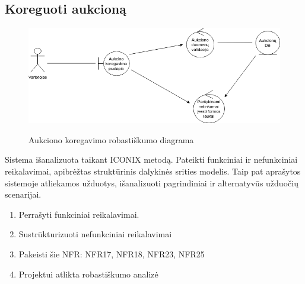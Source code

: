 \documentclass{VUMIFPSkursinis}
\begin{document}
	\subsection{Koreguoti aukcioną}
		\begin{figure}[H]
		\centering
		\includegraphics[width=\linewidth]{img/koreguoti.png}
		\label{fig:koregavimas}
		\caption{Aukciono koregavimo robastiškumo diagrama}
	\end{figure}
	
	\newpage
	
	Sistema išanalizuota taikant ICONIX metodą. Pateikti funkciniai ir nefunkciniai reikalavimai, apibrėžtas struktūrinis dalykinės srities modelis. Taip pat aprašytos sistemoje atliekamos užduotys, išanalizuoti pagrindiniai ir alternatyvūs užduočių scenarijai.
	\newpage
	
		\begin{enumerate}
		\item Perrašyti funkciniai reikalavimai.
		\item Sustrūkturizuoti nefunkciniai reikalavimai
		\item  Pakeisti šie NFR: NFR17, NFR18, NFR23, NFR25
		\item Projektui atlikta robastiškumo analizė
	\end{enumerate}
\end{document}
